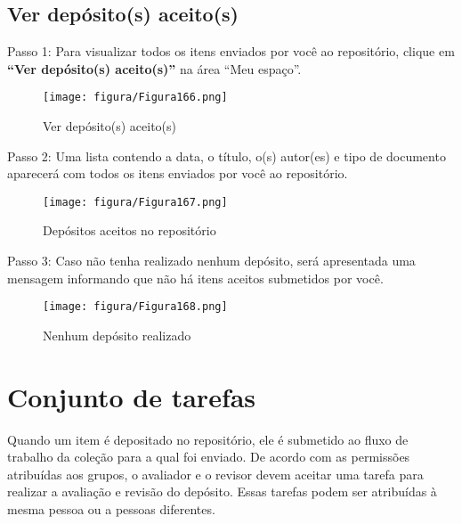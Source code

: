 \documentclass[12pt,hidelinks]{article}
\begin{document}
    \subsection{Ver depósito(s) aceito(s)}
    
    Passo 1: Para visualizar todos os itens enviados por você ao repositório, clique em \textbf{“Ver depósito(s) aceito(s)”} na área “Meu espaço”.
    
\newpage
    
    \begin{figure}[!htp]
                \centering
                \texttt{[image: figura/Figura166.png]}
                \caption{Ver depósito(s) aceito(s)}
            \label{Rotulo}
        \end{figure}
    
    Passo 2: Uma lista contendo a data, o título, o(s) autor(es) e tipo de documento aparecerá com todos os itens enviados por você ao repositório.
    
    \begin{figure}[!htp]
                \centering
                \texttt{[image: figura/Figura167.png]}
                \caption{Depósitos aceitos no repositório}
            \label{Rotulo}
        \end{figure}
    
    Passo 3: Caso não tenha realizado nenhum depósito, será apresentada uma mensagem informando que não há itens aceitos submetidos por você.
    
     \begin{figure}[!htp]
                \centering
                \texttt{[image: figura/Figura168.png]}
                \caption{Nenhum depósito realizado}
            \label{Rotulo}
        \end{figure}

\newpage
\section{Conjunto de tarefas}
\newpage
    
    Quando um item é depositado no repositório, ele é submetido ao fluxo de trabalho da coleção para a qual foi enviado. De acordo com as permissões atribuídas aos grupos, o avaliador e o revisor devem aceitar uma tarefa para realizar a avaliação e revisão do depósito. Essas tarefas podem ser atribuídas à mesma pessoa ou a pessoas diferentes.
    
    \singlespacing
    
\end{document}

